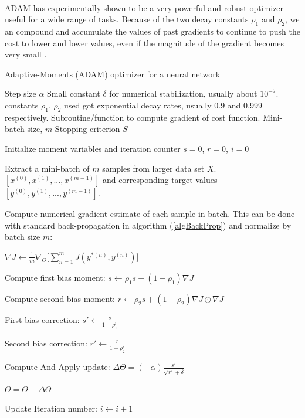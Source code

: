 \documentclass[12pt,letterpaper]{article}
\begin{document}
\paragraph*{}ADAM has experimentally shown to be a very powerful and robust optimizer useful for a wide range of tasks. Because of the two decay constants $\rho_1$ and $\rho_2$, we an compound and accumulate the values of past gradients to continue to push the cost to lower and lower values, even if the magnitude of the gradient becomes very small \cite{Geron}. 

\begin{algorithm}[H]
\caption{Adaptive-Moments (ADAM) optimizer for a neural network}
\label{algAdaGrad}

\begin{algorithmic}
\REQUIRE Step size $\alpha$
\REQUIRE Small constant $\delta$ for numerical stabilization, usually about $10^{-7}$.
\REQUIRE constants $\rho_1$, $\rho_2$ used got exponential decay rates, usually $0.9$ and $0.999$ respectively.
\REQUIRE Subroutine/function to compute gradient of cost function.
\REQUIRE Mini-batch size, $m$
\REQUIRE Stopping criterion $S$

Initialize moment variables and iteration counter $s = 0$, $r = 0$, $i = 0$ \\

	\item Extract a mini-batch of $m$ samples from larger data set $X$. $[x^{(0)},x^{(1)},...,x^{(m-1)}]$ and corresponding target values 
	$[y^{(0)},y^{(1)},...,y^{(m-1)}]$.
	\item Compute numerical gradient estimate of each sample in batch. This can be done with standard back-propagation in algorithm (\ref{algBackProp}) and 			 	normalize by batch size $m$:
	\item $\nabla J \leftarrow \frac{1}{m} \nabla_{\Theta} \Big[\sum_{n=1}^{m} J(y^{*(n)},y^{(n)}) \Big]$
	
	\item Compute first bias moment: $s \leftarrow \rho_1 s + (1 - \rho_1) \nabla J$
	\item Compute second bias moment: $r \leftarrow \rho_2 s + (1 - \rho_2) \nabla J \odot \nabla J$
	\item First bias correction: $s' \leftarrow \frac{s}{1 - \rho_1^i}$
	\item Second bias correction: $r' \leftarrow \frac{r}{1 - \rho_2^i}$
	
	\item Compute And Apply update:	$\Delta \Theta = (-\alpha) \frac{s'}{\sqrt{r'} + \delta}$
	\item $\Theta = \Theta + \Delta \Theta$	
	\item Update Iteration number: $i \leftarrow i + 1$
\ENDWHILE

\end{algorithmic}
\end{algorithm}
\end{document}
